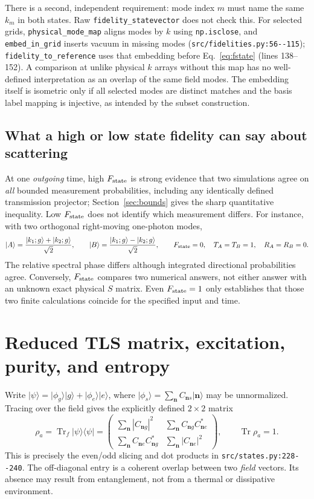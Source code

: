 \documentclass[11pt,a4paper]{article}
\newcommand{\ket}[1]{\lvert #1\rangle}
\newcommand{\bra}[1]{\langle #1\rvert}
\newcommand{\code}[1]{\nolinkurl{#1}}
\newcommand{\Tr}{\operatorname{Tr}}
\begin{document}
There is a second, independent requirement: mode index $m$ must name the same $k_m$ in both states. Raw \code{fidelity_statevector} does not check this. For selected grids, \code{physical_mode_map} aligns modes by $k$ using \code{np.isclose}, and \code{embed_in_grid} inserts vacuum in missing modes (\code{src/fidelities.py:56--115}); \code{fidelity_to_reference} uses that embedding before Eq.~\eqref{eq:fstate} (lines 138--152). A comparison at unlike physical $k$ arrays without this map has no well-defined interpretation as an overlap of the same field modes. The embedding itself is isometric only if all selected modes are distinct matches and the basis label mapping is injective, as intended by the subset construction.

\subsection{What a high or low state fidelity can say about scattering}
At one \emph{outgoing} time, high $F_{\rm state}$ is strong evidence that two simulations agree on \emph{all} bounded measurement probabilities, including any identically defined transmission projector; Section~\ref{sec:bounds} gives the sharp quantitative inequality. Low $F_{\rm state}$ does not identify which measurement differs. For instance, with two orthogonal right-moving one-photon modes,
\begin{equation}
 \ket{A}=\frac{\ket{k_1;g}+\ket{k_2;g}}{\sqrt2},\qquad
 \ket{B}=\frac{\ket{k_1;g}-\ket{k_2;g}}{\sqrt2},
 \qquad F_{\rm state}=0,\quad T_A=T_B=1,\quad R_A=R_B=0.
 \label{eq:orthoright}
\end{equation}
The relative spectral phase differs although integrated directional probabilities agree. Conversely, $F_{\rm state}$ compares two numerical answers, not either answer with an unknown exact physical $S$ matrix. Even $F_{\rm state}=1$ only establishes that those two finite calculations coincide for the specified input and time.

\section{Reduced TLS matrix, excitation, purity, and entropy}
\label{sec:tls}
Write $\ket{\psi}=\ket{\phi_g}\ket g+\ket{\phi_e}\ket e$, where $\ket{\phi_s}=\sum_{\mathbf n}C_{\mathbf n s}\ket{\mathbf n}$ may be unnormalized. Tracing over the field gives the explicitly defined $2\times2$ matrix
\begin{equation}
 \rho_a=\Tr_f\ket\psi\bra\psi
 =\begin{pmatrix}
 \sum_{\mathbf n}|C_{\mathbf n g}|^2&
 \sum_{\mathbf n}C_{\mathbf n g}C_{\mathbf n e}^*\\
 \sum_{\mathbf n}C_{\mathbf n e}C_{\mathbf n g}^*&
 \sum_{\mathbf n}|C_{\mathbf n e}|^2
 \end{pmatrix},\qquad \Tr\rho_a=1.
 \label{eq:rhoa}
\end{equation}
This is precisely the even/odd slicing and dot products in \code{src/states.py:228--240}. The off-diagonal entry is a coherent overlap between two \emph{field} vectors. Its absence may result from entanglement, not from a thermal or dissipative environment.
\end{document}

